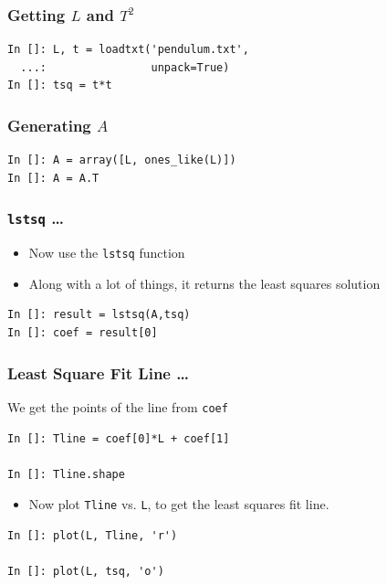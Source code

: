 \documentclass[14pt,compress]{beamer}
\newcommand{\typ}[1]{\lstinline{#1}}
\begin{document}
\begin{frame}[fragile]
\frametitle{Getting $L$ and $T^2$}
\begin{lstlisting}
In []: L, t = loadtxt('pendulum.txt', 
  ...:                unpack=True)
In []: tsq = t*t
\end{lstlisting}
\end{frame}

\begin{frame}[fragile]
\frametitle{Generating $A$}
\begin{lstlisting}
In []: A = array([L, ones_like(L)])
In []: A = A.T
\end{lstlisting}
\end{frame}

\begin{frame}[fragile]
\frametitle{\typ{lstsq} \ldots}
\begin{itemize}
\item Now use the \typ{lstsq} function
\item Along with a lot of things, it returns the least squares solution
\end{itemize}
\begin{lstlisting}
In []: result = lstsq(A,tsq)
In []: coef = result[0]
\end{lstlisting}
\end{frame}

\begin{frame}[fragile]
\frametitle{Least Square Fit Line \ldots}
We get the points of the line from \typ{coef}
\begin{lstlisting}
In []: Tline = coef[0]*L + coef[1]

In []: Tline.shape
\end{lstlisting}
\begin{itemize}
\item Now plot \typ{Tline} vs. \typ{L}, to get the least squares fit line. 
\end{itemize}
\begin{lstlisting}
In []: plot(L, Tline, 'r')

In []: plot(L, tsq, 'o')
\end{lstlisting}
\end{frame}
\end{document}
